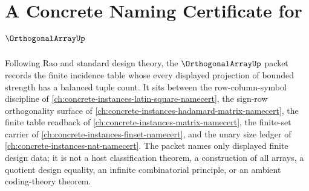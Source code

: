 \chapter{A Concrete Naming Certificate for $\OrthogonalArrayUp$}
\label{ch:concrete-instances-orthogonal-array-namecert}

Following Rao and standard design theory, the $\OrthogonalArrayUp$ packet records the finite incidence table whose every displayed projection of bounded strength has a balanced tuple count. It sits between the row-column-symbol discipline of \autoref{ch:concrete-instances-latin-square-namecert}, the sign-row orthogonality surface of \autoref{ch:concrete-instances-hadamard-matrix-namecert}, the finite table readback of \autoref{ch:concrete-instances-matrix-namecert}, the finite-set carrier of \autoref{ch:concrete-instances-finset-namecert}, and the unary size ledger of \autoref{ch:concrete-instances-nat-namecert}. The packet names only displayed finite design data; it is not a host classification theorem, a construction of all arrays, a quotient design equality, an infinite combinatorial principle, or an ambient coding-theory theorem.

